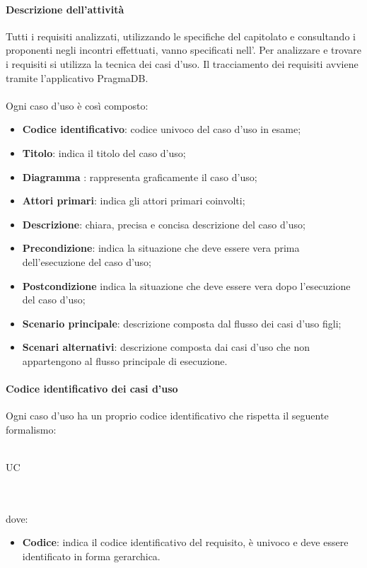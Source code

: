  \paragraph{Descrizione dell'attività}
 Tutti i requisiti analizzati, utilizzando le specifiche del capitolato e consultando i proponenti negli
incontri effettuati, vanno specificati nell'\ARdoc. Per analizzare e trovare i
requisiti si utilizza la tecnica dei casi d'uso. Il tracciamento dei requisiti avviene tramite l'applicativo PragmaDB.

 \paragraph{}
 Ogni caso d'uso è così composto:
 \begin{itemize}
  \item \textbf{Codice identificativo}: codice univoco del caso d'uso in esame;
  \item \textbf{Titolo}: indica il titolo del caso d'uso;
  \item \textbf{Diagramma }: rappresenta graficamente il caso d'uso;
  \item \textbf{Attori primari}: indica gli attori primari coinvolti;
  \item \textbf{Descrizione}: chiara, precisa e concisa descrizione del caso d'uso;
  \item \textbf{Precondizione}: indica la situazione che deve essere vera prima dell'esecuzione del caso d'uso;
  \item \textbf{Postcondizione} indica la situazione che deve essere vera dopo l'esecuzione del caso d'uso;
  \item \textbf{Scenario principale}: descrizione composta dal flusso dei casi d'uso figli;
  \item \textbf{Scenari alternativi}: descrizione composta dai casi d'uso che non appartengono al flusso
principale di esecuzione.
 \end{itemize}
 \paragraph{Codice identificativo dei casi d'uso}
Ogni caso d'uso ha un proprio codice identificativo  che rispetta il seguente formalismo:\\ \\
\centerline{UC\textbraceright{}}
\\ \\dove:
\begin{itemize}
	\item \textbf{Codice}: indica il codice identificativo del requisito, è univoco e deve essere identificato in forma gerarchica.
\end{itemize}
